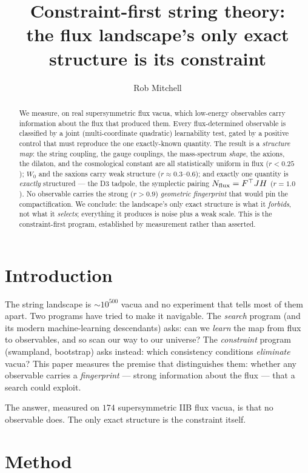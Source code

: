 \documentclass[11pt]{article}
\title{Constraint-first string theory:\\ the flux landscape's only exact structure is its constraint}
\author{Rob Mitchell}
\date{}
\begin{document}
\maketitle

\begin{abstract}
We measure, on real supersymmetric flux vacua, which low-energy observables carry
information about the flux that produced them. Every flux-determined observable is
classified by a joint (multi-coordinate quadratic) learnability test, gated by a
positive control that must reproduce the one exactly-known quantity. The result is a
\emph{structure map}: the string coupling, the gauge couplings, the mass-spectrum
\emph{shape}, the axions, the dilaton, and the cosmological constant are all
statistically uniform in flux ($r < 0.25$); $W_0$ and the saxions carry weak
structure ($r \approx 0.3$--$0.6$); and exactly one quantity is \emph{exactly}
structured --- the D3 tadpole, the symplectic pairing $N_{\rm flux} = F^\top J H$
($r = 1.0$). No observable carries the strong ($r > 0.9$) \emph{geometric
fingerprint} that would pin the compactification. We conclude: the landscape's only
exact structure is what it \emph{forbids}, not what it \emph{selects}; everything it
produces is noise plus a weak scale. This is the constraint-first program,
established by measurement rather than asserted.
\end{abstract}

\section{Introduction}

The string landscape is $\sim 10^{500}$ vacua and no experiment that tells most of
them apart. Two programs have tried to make it navigable. The \emph{search} program
(and its modern machine-learning descendants) asks: can we \emph{learn} the map from
flux to observables, and so scan our way to our universe? The \emph{constraint}
program (swampland, bootstrap) asks instead: which consistency conditions
\emph{eliminate} vacua? This paper measures the premise that distinguishes them:
whether any observable carries a \emph{fingerprint} --- strong information about the
flux --- that a search could exploit.

The answer, measured on $174$ supersymmetric IIB flux vacua, is that no observable
does. The only exact structure is the constraint itself.

\section{Method}
\end{document}
